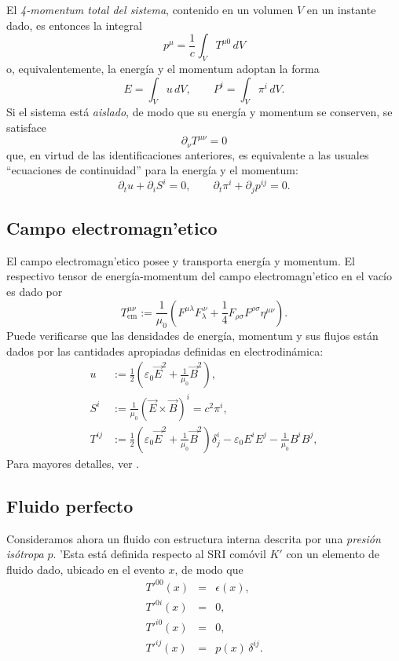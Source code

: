 El \textit{4-momentum total del sistema}, contenido en un volumen $V$ en un instante dado, es entonces la integral
\begin{equation}
p^\mu=\frac{1}{c}\int_V T^{\mu 0}\,dV \label{pmTmn}
\end{equation}
o, equivalentemente, la energía y el momentum adoptan la forma
\begin{equation}
E=\int_V u\,dV, \qquad P^i=\int_V \pi^i\,dV.
\end{equation}
Si el sistema está \textit{aislado}, de modo que su energía y momentum se conserven, se satisface 
\begin{equation}
 \partial_\nu T^{\mu \nu}=0
\end{equation}
que, en virtud de las identificaciones anteriores, es equivalente a las usuales ``ecuaciones de continuidad'' para la energía y el momentum:
\begin{equation}
 \partial_tu+\partial_iS^i=0, \qquad \partial_t \pi^i+\partial_jp^{ij}=0.
\end{equation}


\subsection{Campo electromagn'etico}
El campo electromagn'etico posee y transporta energía y momentum. El respectivo tensor de energía-momentum del campo electromagn'etico en el vacío es dado por
\begin{equation}
\boxed{T_\text{em}^{\mu\nu}:=\frac{1}{\mu_0}\left(  F^{\mu\lambda}F_\lambda^{\ \nu}+\frac{1}{4}F_{\rho\sigma}F^{\rho\sigma}\eta^{\mu\nu} \right).}  \label{temsimSI}
\end{equation}
Puede verificarse que las densidades de energía, momentum y sus flujos están dados por las cantidades apropiadas definidas en electrodinámica:
\begin{align}
u &:= \frac{1}{2}\left(\varepsilon_0\vec{E}^2+\frac{1}{\mu_0}\vec{B}^2\right),\label{uTheta}\\
S^i &:= \frac{1}{\mu_0}\left(\vec{E}\times\vec{B}\right)^i=c^2\pi^i, \label{STheta}\\
T^{ij} &:= \frac{1}{2}\left(\varepsilon_0\vec{E}^2+\frac{1}{\mu_0}\vec{B}^2\right)\delta_j^i-\varepsilon_0 E^i E^j -\frac{1}{\mu_0}B^i B^j , \label{TTheta}
\end{align}
Para mayores detalles, ver \cite{7}.


\subsection{Fluido perfecto}
Consideramos ahora un fluido con estructura interna descrita por una \textit{presión
isótropa} $p$. 'Esta está definida respecto al SRI comóvil $K'$ con un elemento de fluido dado, ubicado en el evento $x$, de modo que
\begin{eqnarray}
T'^{00}(x)&=&\epsilon(x) , \label{t00c}\\
T'^{0i}(x) &=&0, \label{t0ic}\\
T'^{i0}(x) &=&0, \label{ti0c}\\
T'^{ij}(x) &=&p(x)\,\delta^{ij} .\label{tijc}
\end{eqnarray}

